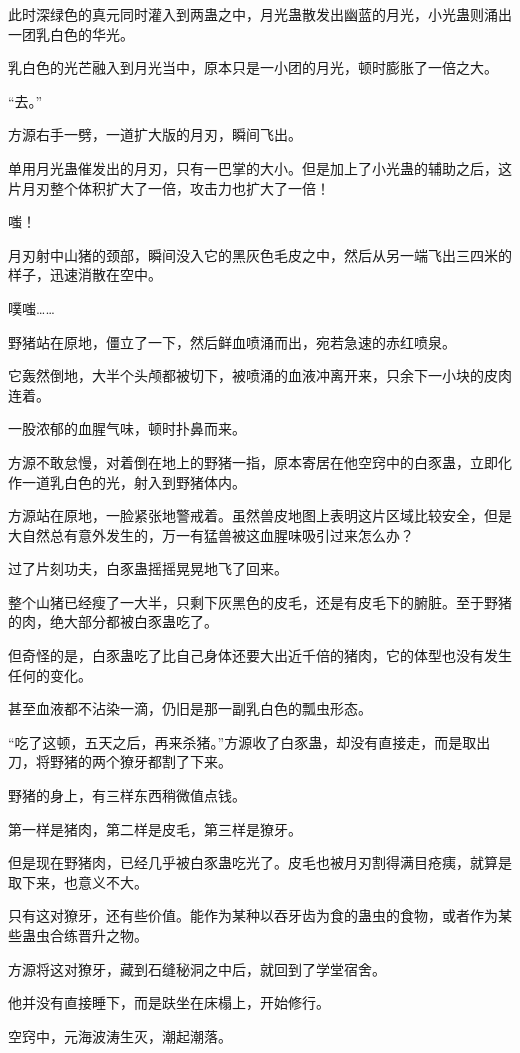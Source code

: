 \begin{this_body}
此时深绿色的真元同时灌入到两蛊之中，月光蛊散发出幽蓝的月光，小光蛊则涌出一团乳白色的华光。

乳白色的光芒融入到月光当中，原本只是一小团的月光，顿时膨胀了一倍之大。

“去。”

方源右手一劈，一道扩大版的月刃，瞬间飞出。

单用月光蛊催发出的月刃，只有一巴掌的大小。但是加上了小光蛊的辅助之后，这片月刃整个体积扩大了一倍，攻击力也扩大了一倍！

嗤！

月刃射中山猪的颈部，瞬间没入它的黑灰色毛皮之中，然后从另一端飞出三四米的样子，迅速消散在空中。

噗嗤……

野猪站在原地，僵立了一下，然后鲜血喷涌而出，宛若急速的赤红喷泉。

它轰然倒地，大半个头颅都被切下，被喷涌的血液冲离开来，只余下一小块的皮肉连着。

一股浓郁的血腥气味，顿时扑鼻而来。

方源不敢怠慢，对着倒在地上的野猪一指，原本寄居在他空窍中的白豕蛊，立即化作一道乳白色的光，射入到野猪体内。

方源站在原地，一脸紧张地警戒着。虽然兽皮地图上表明这片区域比较安全，但是大自然总有意外发生的，万一有猛兽被这血腥味吸引过来怎么办？

过了片刻功夫，白豕蛊摇摇晃晃地飞了回来。

整个山猪已经瘦了一大半，只剩下灰黑色的皮毛，还是有皮毛下的腑脏。至于野猪的肉，绝大部分都被白豕蛊吃了。

但奇怪的是，白豕蛊吃了比自己身体还要大出近千倍的猪肉，它的体型也没有发生任何的变化。

甚至血液都不沾染一滴，仍旧是那一副乳白色的瓢虫形态。

“吃了这顿，五天之后，再来杀猪。”方源收了白豕蛊，却没有直接走，而是取出刀，将野猪的两个獠牙都割了下来。

野猪的身上，有三样东西稍微值点钱。

第一样是猪肉，第二样是皮毛，第三样是獠牙。

但是现在野猪肉，已经几乎被白豕蛊吃光了。皮毛也被月刃割得满目疮痍，就算是取下来，也意义不大。

只有这对獠牙，还有些价值。能作为某种以吞牙齿为食的蛊虫的食物，或者作为某些蛊虫合练晋升之物。

方源将这对獠牙，藏到石缝秘洞之中后，就回到了学堂宿舍。

他并没有直接睡下，而是趺坐在床榻上，开始修行。

空窍中，元海波涛生灭，潮起潮落。


\end{this_body}
